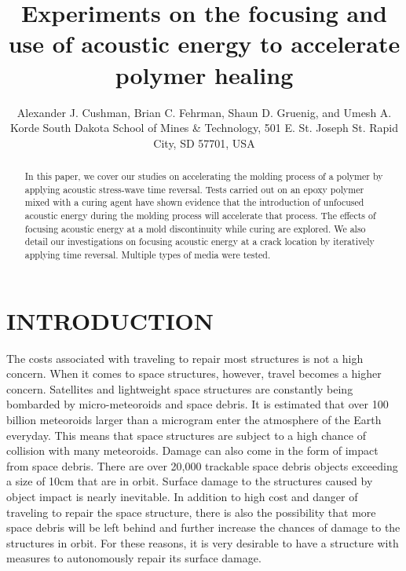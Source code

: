 \documentclass[a4paper]{spie}  %
\title{Experiments on the focusing and use of acoustic energy to accelerate polymer healing}
\author{Alexander J. Cushman\supit{a}, Brian C. Fehrman\supit{a}, Shaun D. Gruenig\supit{a}, and Umesh A. Korde\supit{a}
\skiplinehalf
\supit{a}South Dakota School of Mines \& Technology, 501 E. St. Joseph St. Rapid City, SD 57701, USA \\
}
\begin{document}
 
  \maketitle 

\begin{abstract}
In this paper, we cover our studies on accelerating the molding process of a polymer by applying acoustic stress-wave time reversal. Tests carried out on an epoxy polymer mixed with a curing agent have shown evidence that the introduction of unfocused acoustic energy during the molding process will accelerate that process. The effects of focusing acoustic energy at a mold discontinuity while curing are explored. We also detail our investigations on focusing acoustic energy at a crack location by iteratively applying time reversal. Multiple types of media were tested.
\end{abstract}



\section{INTRODUCTION}
\label{sec:intro}  %
The costs associated with traveling to repair most structures is not a high concern. When it comes to space structures, however, travel becomes a higher concern. Satellites and lightweight space structures are constantly being bombarded by micro-meteoroids and space debris. It is estimated that over 100 billion meteoroids larger than a microgram enter the atmosphere of the Earth everyday. This means that space structures are subject to a high chance of collision with many meteoroids. Damage can also come in the form of impact from space debris. There are over 20,000 trackable space debris objects exceeding a size of 10cm that are in orbit. Surface damage to the structures caused by object impact is nearly inevitable. In addition to high cost and danger of traveling to repair the space structure, there is also the possibility that more space debris will be left behind and further increase the chances of damage to the structures in orbit. For these reasons, it is very desirable to have a structure with measures to autonomously repair its surface damage. 
\end{document}
